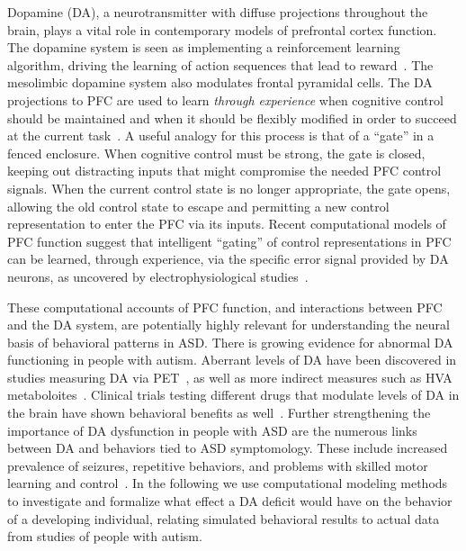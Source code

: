\documentclass[man]{apa}
\begin{document}
Dopamine (DA), a neurotransmitter with diffuse projections throughout the brain, plays a vital role in contemporary models of prefrontal cortex function.  The dopamine system is seen as implementing a reinforcement learning algorithm, driving the learning of action sequences that lead to reward~\cite{MontaguePR:1996:Dopamine,BartoAG:1994:TDLearning}.  The mesolimbic dopamine system also modulates frontal pyramidal cells.  The DA projections to PFC are used to learn \emph{through experience} when cognitive control should be maintained and when it should be flexibly modified in order to succeed at the current task~\cite{BraverTS:2000:Control,RougierNP:2005:XT}. A useful analogy for this process is that of a “gate” in a fenced enclosure. When cognitive control must be strong, the gate is closed, keeping out distracting inputs that might compromise the needed PFC control signals. When the current control state is no longer appropriate, the gate opens, allowing the old control state to escape and permitting a new control representation to enter the PFC via its inputs.  Recent computational models of PFC function suggest that intelligent ``gating'' of control representations in PFC can be learned, through experience, via the specific error signal provided by DA neurons, as uncovered by electrophysiological studies~\cite{RougierNP:2005:XT,RougierNP:2002:TaskSwitching}. 

These computational accounts of PFC function, and interactions between PFC and the DA system, are potentially highly relevant for understanding the neural basis of behavioral patterns in ASD.  There is growing evidence for abnormal DA functioning in people with autism.  Aberrant levels of DA have been discovered in studies measuring DA via PET~\cite{FernellE:1997:AutismPET}, as well as more indirect measures such as HVA metaboloites~\cite{MartineauJ:1992:AutismDopamine}.  Clinical trials testing different drugs that modulate levels of DA in the brain have shown behavioral benefits as well~\cite{PoseyDJ:2000:AutismDopamine,TsaiLY:1999:AutismDopamine}. Further strengthening the importance of DA dysfunction in people with ASD are the numerous links between DA and behaviors tied to ASD symptomology.  These include increased prevalence of seizures, repetitive behaviors, and problems with skilled motor learning and control~\cite{RefWorks:1,RefWorks:3,RefWorks:5,RefWorks:2,RefWorks:109}.  In the following we use computational modeling methods to investigate and formalize what effect a DA deficit would have on the behavior of a developing individual, relating simulated behavioral results to actual data from studies of people with autism.  
\end{document}
